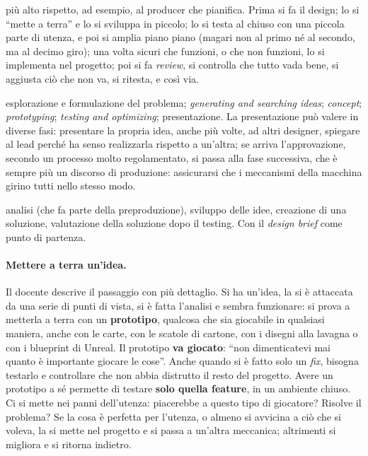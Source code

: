 \begin{description}
        più alto rispetto, ad esempio, al producer che pianifica. Prima si fa
        il design; lo si ``mette a terra'' e lo si sviluppa in piccolo; lo si
        testa al chiuso con una piccola parte di utenza, e poi si amplia piano
        piano (magari non al primo né al secondo, ma al decimo giro); una
        volta sicuri che funzioni, o che non funzioni, lo si implementa nel
        progetto; poi si fa \emph{review}, si controlla che tutto vada bene, si
        aggiusta ciò che non va, si ritesta, e così via.
  \item[Exploring and formulating the problem] esplorazione e formulazione
        del problema; \emph{generating and searching ideas}; \emph{concept};
        \emph{prototyping}; \emph{testing and optimizing}; presentazione. La
        presentazione può valere in diverse fasi: presentare la propria idea,
        anche più volte, ad altri designer, spiegare al lead perché ha senso
        realizzarla rispetto a un'altra; se arriva l'approvazione, secondo un
        processo molto regolamentato, si passa alla fase successiva, che è
        sempre più un discorso di produzione: assicurarsi che i meccanismi
        della macchina girino tutti nello stesso modo.
  \item[Il ciclo in quattro spicchi] analisi (che fa parte della
        preproduzione), sviluppo delle idee, creazione di una soluzione,
        valutazione della soluzione dopo il testing. Con il \emph{design
        brief} come punto di partenza.
\end{description}

\paragraph{Mettere a terra un'idea.} Il docente descrive il passaggio con
più dettaglio. Si ha un'idea, la si è attaccata da una serie di punti di
vista, si è fatta l'analisi e sembra funzionare: si prova a metterla a terra
con un \textbf{prototipo}, qualcosa che sia giocabile in qualsiasi maniera,
anche con le carte, con le scatole di cartone, con i disegni alla lavagna o
con i blueprint di Unreal. Il prototipo \textbf{va giocato}: ``non
dimenticatevi mai quanto è importante giocare le cose''. Anche quando si è
fatto solo un \emph{fix}, bisogna testarlo e controllare che non abbia
distrutto il resto del progetto. Avere un prototipo a sé permette di testare
\textbf{solo quella feature}, in un ambiente chiuso. Ci si mette nei panni
dell'utenza: piacerebbe a questo tipo di giocatore? Risolve il problema? Se la
cosa è perfetta per l'utenza, o almeno si avvicina a ciò che si voleva, la si
mette nel progetto e si passa a un'altra meccanica; altrimenti si migliora e
si ritorna indietro.

